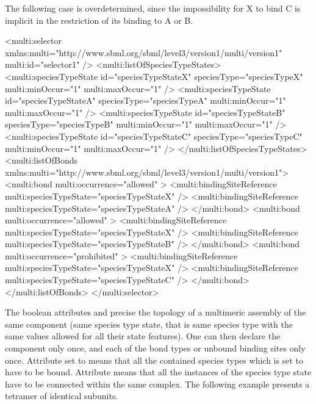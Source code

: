 The following case is overdetermined, since the impossibility for X to bind C is implicit in the restriction of its binding to A or B.

\begin{example}
<multi:selector xmlns:multi="http://www.sbml.org/sbml/level3/version1/multi/version1" 
                multi:id="selector1" />
  <multi:listOfSpeciesTypeStates>
    <multi:speciesTypeState id="speciesTypeStateX" speciesType="speciesTypeX"                                           
                            multi:minOccur="1" multi:maxOccur="1" />
    <multi:speciesTypeState id="speciesTypeStateA" speciesType="speciesTypeA"                           
                            multi:minOccur="1" multi:maxOccur="1" />
    <multi:speciesTypeState id="speciesTypeStateB" speciesType="speciesTypeB"                           
                            multi:minOccur="1" multi:maxOccur="1" />
    <multi:speciesTypeState id="speciesTypeStateC" speciesType="speciesTypeC"                           
                            multi:minOccur="1" multi:maxOccur="1" />
  </multi:listOfSpeciesTypeStates>
  <multi:listOfBonds xmlns:multi="http://www.sbml.org/sbml/level3/version1/multi/version1">
    <multi:bond multi:occurrence="allowed" >
      <multi:bindingSiteReference multi:speciesTypeState="speciesTypeStateX" />
      <multi:bindingSiteReference multi:speciesTypeState="speciesTypeStateA" />
    </multi:bond>
    <multi:bond multi:occurrence="allowed" >
      <multi:bindingSiteReference multi:speciesTypeState="speciesTypeStateX" />
      <multi:bindingSiteReference multi:speciesTypeState="speciesTypeStateB" />
    </multi:bond>
    <multi:bond multi:occurrence="prohibited" >
      <multi:bindingSiteReference multi:speciesTypeState="speciesTypeStateX" />
      <multi:bindingSiteReference multi:speciesTypeState="speciesTypeStateC" />
    </multi:bond>
  </multi:listOfBonds>
</multi:selector> 
\end{example}

The boolean attributes  and  precise the topology of a multimeric assembly of the same component (same species type state, that is same species type with the same values allowed for all their state features). One can then declare the component only once, and each of the bond types or unbound binding sites only once. Attribute  set to  means that all the contained species types which  is set to  have to be bound. Attribute  means that all the instances of the species type state have to be connected within the same complex. The following example presents a tetramer of identical subunits. 


